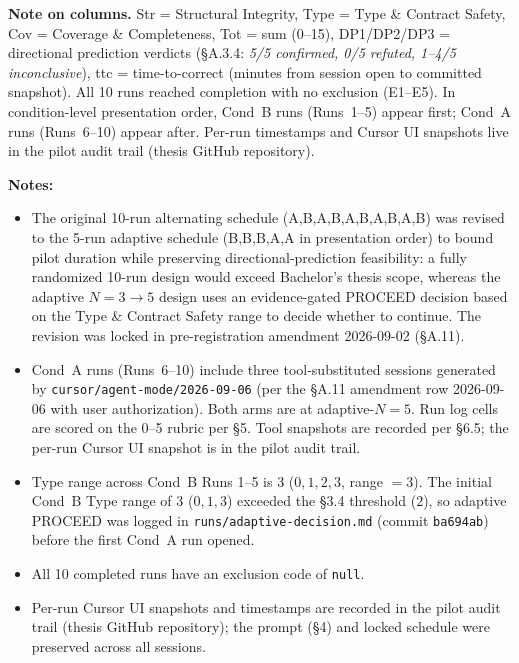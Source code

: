 \smallskip\noindent\textbf{Note on columns.} Str = Structural Integrity, Type = Type \& Contract Safety, Cov = Coverage \& Completeness, Tot = sum (0--15), DP1/DP2/DP3 = directional prediction verdicts (\S A.3.4: \emph{5/5 confirmed, 0/5 refuted, 1--4/5 inconclusive}), ttc = time-to-correct (minutes from session open to committed snapshot). All 10 runs reached completion with no exclusion (E1--E5). In condition-level presentation order, Cond~B runs (Runs~1--5) appear first; Cond~A runs (Runs~6--10) appear after. Per-run timestamps and Cursor UI snapshots live in the pilot audit trail (thesis GitHub repository).
\normalsize

\textbf{Notes:}
\begin{itemize}
\item The original 10-run alternating schedule (A,B,A,B,A,B,A,B,A,B) was
revised to the 5-run adaptive schedule (B,B,B,A,A in presentation order) to bound pilot duration
while preserving directional-prediction feasibility: a fully randomized
10-run design would exceed Bachelor's thesis scope, whereas the adaptive
$N{=}3\!\to\!5$ design uses an evidence-gated PROCEED decision based on
the Type \& Contract Safety range to decide whether to continue. The
revision was locked in pre-registration amendment 2026-09-02 (\S A.11).
\item Cond~A runs (Runs~6--10) include three tool-substituted
sessions generated by \texttt{cursor/agent-mode/2026-09-06}
(per the \S A.11 amendment row 2026-09-06 with user authorization). Both arms are at adaptive-$N=5$. Run log cells are scored on the 0--5 rubric per \S5. Tool snapshots are recorded per \S6.5; the per-run Cursor UI snapshot is in the pilot audit trail.
\item Type range across Cond~B Runs 1--5 is $3$ ($0, 1, 2, 3$, range $=3$). The initial Cond~B Type range of $3$ ($0, 1, 3$) exceeded the \S3.4 threshold ($2$), so adaptive PROCEED was logged in
\texttt{runs/adaptive-decision.md} (commit \texttt{ba694ab})
before the first Cond~A run opened.
\item All 10 completed runs have an exclusion code of \texttt{null}.
\item Per-run Cursor UI snapshots and timestamps are recorded in the pilot audit trail (thesis GitHub repository); the prompt (\S4) and locked schedule were preserved across all sessions.
\end{itemize}


